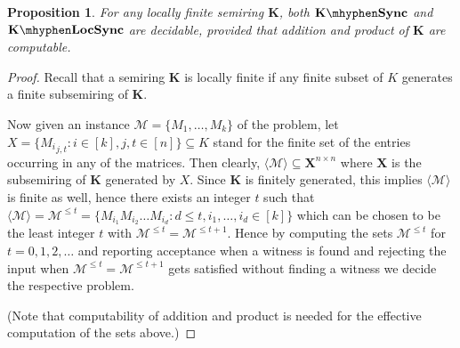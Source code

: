 \documentclass[submission,copyright,creativecommons]{eptcs}
\def\bK{{\mathbf{K}}}
\theoremstyle{plain}
\newtheorem{proposition}{Proposition}
\theoremstyle{definition}
\theoremstyle{remark}
\begin{document}
\begin{proposition}
For any locally finite semiring $\bK$, both $\bK\mhyphen\mathbf{Sync}$ and
$\bK\mhyphen\mathbf{LocSync}$ are decidable, provided that addition and product of $\bK$ are computable.
\end{proposition}
\begin{proof}
Recall that a semiring $\bK$ is locally finite if any finite subset of $K$ generates a finite subsemiring of $\bK$.

Now given an instance $\mathcal{M}=\{M_1,\ldots,M_k\}$ of the problem,
let $X=\{{M_i}_{j,t}:i\in[k],j,t\in[n]\}\subseteq K$ stand for the finite set of the entries occurring in any of the matrices.
Then clearly, $\langle \mathcal{M}\rangle\subseteq \mathbf{X}^{n\times n}$ where $\mathbf{X}$ is the subsemiring of $\bK$
generated by $X$.
Since $\bK$ is finitely generated, this
implies $\langle\mathcal{M}\rangle$ is finite as well, hence there exists an integer $t$ such that $\langle\mathcal{M}\rangle
=\mathcal{M}^{\leq t}=\{M_{i_1}M_{i_2}\ldots M_{i_d}:d\leq t,i_1,\ldots,i_d\in[k]\}$ which can be chosen to be the least integer 
$t$ with $\mathcal{M}^{\leq t}=\mathcal{M}^{\leq t+1}$. Hence by computing the sets $\mathcal{M}^{\leq t}$ for $t=0,1,2,\ldots$
and reporting acceptance when a witness is found and rejecting the input when $\mathcal{M}^{\leq t}=\mathcal{M}^{\leq t+1}$
gets satisfied without finding a witness we decide the respective problem.

(Note that computability of addition and product is needed for the effective computation of the sets above.)
\end{proof}
\end{document}
